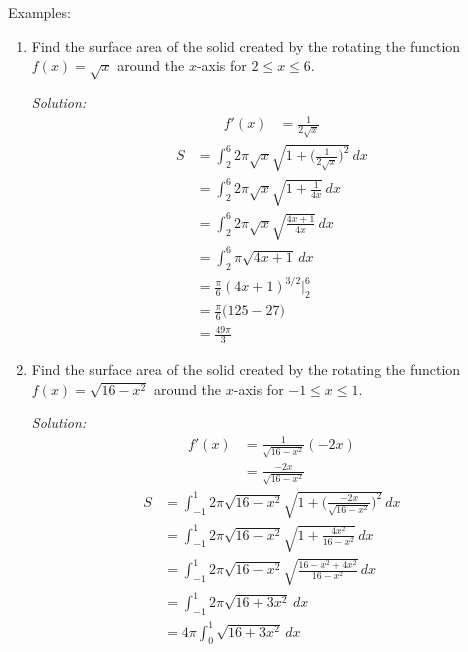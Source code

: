 \documentclass[16pt]{article}
\theoremstyle{remark}
\begin{document}
Examples:
\begin{enumerate}
\item Find the surface area of the solid created by the rotating the function $f(x) = \sqrt{x}$ around the $x$-axis for $2 \leq x \leq 6$.
\begin{mdframed}[style=TheoremFrame]
\textit{Solution:}
\begin{align*}
f'(x) &= \frac{1}{2\sqrt{x}}
\end{align*}
\begin{align*}
S&= \int_2^6 2\pi \sqrt{x} \sqrt{1 + \bigg(\frac{1}{2\sqrt{x}}\bigg)^2} \, dx\\
&= \int_2^6 2\pi \sqrt{x} \sqrt{1 + \frac{1}{4x}} \, dx\\
&= \int_2^6 2\pi \sqrt{x} \sqrt{\frac{4x+1}{4x}} \, dx\\
&= \int_2^6 \pi \sqrt{4x+1} \, dx\\
&= \frac{\pi}{6} (4x+1)^{3/2} \bigg|_2^6\\
&= \frac{\pi}{6}\bigg(125-27)\\
&= \frac{49\pi}{3} 
\end{align*}
\end{mdframed}
\newpage
\item Find the surface area of the solid created by the rotating the function $f(x) = \sqrt{16-x^2}$ around the $x$-axis for $-1 \leq x \leq 1$.
\begin{mdframed}[style=TheoremFrame]
\textit{Solution:}
\begin{align*}
f'(x) &= \frac{1}{\sqrt{16-x^2}}(-2x)\\
&= \frac{-2x}{\sqrt{16-x^2}}
\end{align*}
\begin{align*}
S&= \int_{-1}^1 2\pi \sqrt{16-x^2} \sqrt{1+\bigg(\frac{-2x}{\sqrt{16-x^2}}\bigg)^2}\, dx\\
&= \int_{-1}^1 2\pi \sqrt{16-x^2} \sqrt{1+\frac{4x^2}{16-x^2}}\, dx\\
&= \int_{-1}^1 2\pi \sqrt{16-x^2} \sqrt{\frac{16-x^2+4x^2}{16-x^2}}\, dx\\
&= \int_{-1}^1 2\pi \sqrt{16+3x^2}\, dx\\
&= 4\pi \int_0^1 \sqrt{16+3x^2}\, dx\\
\end{align*}


\end{mdframed}
\end{enumerate}
\end{document}
